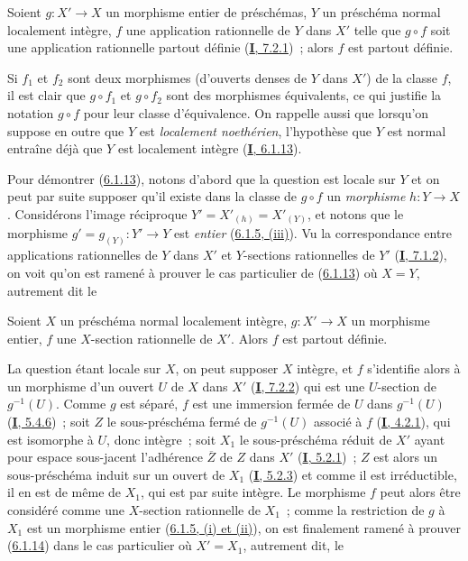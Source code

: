 \begin{proposition}[6.1.13]
\label{II.6.1.13-fr}
Soient $g:X'\to X$ un morphisme entier de préschémas, $Y$ un préschéma normal
localement intègre, $f$ une application rationnelle de $Y$ dans $X'$ telle
que $g\circ f$ soit une application rationnelle partout définie
\textup{(\hyperref[I.7.2.1-fr]{\textbf{I}, 7.2.1})}~; alors $f$ est partout définie.
\end{proposition}

Si $f_1$ et $f_2$ sont deux morphismes (d'ouverts denses de $Y$ dans $X'$) de
la classe $f$, il est clair que $g\circ f_1$ et $g\circ f_2$ sont des
morphismes équivalents, ce qui justifie la notation $g\circ f$ pour leur
classe d'équivalence. On rappelle aussi que lorsqu'on suppose en outre que
$Y$ est \emph{localement noethérien}, l'hypothèse que $Y$ est normal entraîne déjà
que $Y$ est localement intègre (\hyperref[I.6.1.13-fr]{\textbf{I}, 6.1.13}).

Pour démontrer (\hyperref[II.6.1.13-fr]{6.1.13}), notons d'abord que la
question est locale sur $Y$ et on peut par suite supposer qu'il existe dans
la classe de $g\circ f$ un \emph{morphisme} $h:Y\to X$. Considérons l'image
réciproque $Y'=X'_{(h)}=X'_{(Y)}$, et notons que le morphisme
$g'=g_{(Y)}:Y'\to Y$ est \emph{entier}
(\hyperref[II.6.1.5-fr]{6.1.5, (iii)}). Vu la correspondance entre
applications rationnelles de $Y$ dans $X'$ et $Y$-sections rationnelles de
$Y'$ (\hyperref[I.7.1.2-fr]{\textbf{I}, 7.1.2}), on voit qu'on est ramené à prouver le
cas particulier de (\hyperref[II.6.1.13-fr]{6.1.13}) où $X=Y$, autrement dit
le

\begin{corollary}[6.1.14]
\label{II.6.1.14-fr}
Soient $X$ un préschéma normal localement intègre, $g:X'\to X$ un morphisme
\textup{entier}, $f$ une $X$-section rationnelle de $X'$. Alors $f$ est partout
définie.
\end{corollary}

La question étant locale sur $X$, on peut supposer $X$ intègre, et $f$
s'identifie alors à un morphisme d'un ouvert $U$ de $X$ dans $X'$
(\hyperref[I.7.2.2-fr]{\textbf{I}, 7.2.2}) qui est une $U$-section de $g^{-1}(U)$.
Comme $g$ est séparé, $f$ est une immersion fermée de $U$ dans $g^{-1}(U)$
(\hyperref[I.5.4.6-fr]{\textbf{I}, 5.4.6})~; soit $Z$ le sous-préschéma fermé de
$g^{-1}(U)$ associé à $f$ (\hyperref[I.4.2.1-fr]{\textbf{I}, 4.2.1}), qui est
isomorphe à $U$, donc intègre~; soit $X_1$ le sous-préschéma réduit de $X'$
ayant pour espace sous-jacent l'adhérence $\overline{Z}$ de $Z$ dans $X'$
(\hyperref[I.5.2.1-fr]{\textbf{I}, 5.2.1})~; $Z$ est alors un sous-préschéma induit
sur un ouvert de $X_1$ (\hyperref[I.5.2.3-fr]{\textbf{I}, 5.2.3}) et comme il est
irréductible, il en est de même de $X_1$, qui est par suite intègre. Le
morphisme $f$ peut alors être considéré comme une $X$-section rationnelle de
$X_1$~; comme la restriction de $g$ à $X_1$ est un morphisme entier
(\hyperref[II.6.1.5-fr]{6.1.5, (i) et (ii)}), on est finalement ramené à
prouver (\hyperref[II.6.1.14-fr]{6.1.14}) dans le cas particulier où
$X'=X_1$, autrement dit, le

